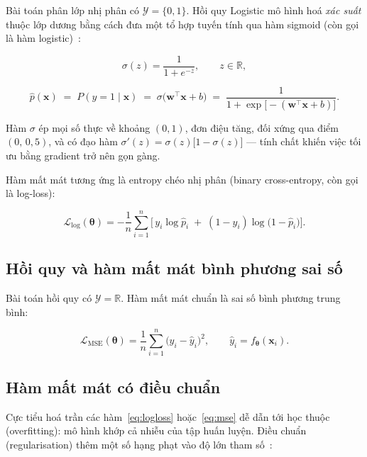 Bài toán phân lớp nhị phân có $\mathcal{Y}=\{0,1\}$. Hồi quy Logistic mô hình
hoá \emph{xác suất} thuộc lớp dương bằng cách đưa một tổ hợp tuyến tính qua
hàm sigmoid (còn gọi là hàm logistic)~\cite{bishop2006}:

\begin{equation}
\sigma(z) = \frac{1}{1+e^{-z}}, \qquad z \in \mathbb{R},
\label{eq:sigmoid}
\end{equation}

\begin{equation}
\hat p(\mathbf{x}) \;=\; P(y=1\mid \mathbf{x})
\;=\; \sigma\!\big(\mathbf{w}^{\!\top}\mathbf{x}+b\big)
\;=\; \frac{1}{1+\exp\!\big[-(\mathbf{w}^{\!\top}\mathbf{x}+b)\big]}.
\label{eq:logistic}
\end{equation}

\noindent Hàm $\sigma$ ép mọi số thực về khoảng $(0,1)$, đơn điệu tăng, đối
xứng qua điểm $(0,\,0{,}5)$, và có đạo hàm
$\sigma'(z)=\sigma(z)\big[1-\sigma(z)\big]$ --- tính chất khiến việc tối ưu
bằng gradient trở nên gọn gàng.

Hàm mất mát tương ứng là entropy chéo nhị phân (binary cross-entropy, còn gọi
là log-loss):

\begin{equation}
\mathcal{L}_{\mathrm{log}}(\bm\theta)
= -\frac{1}{n}\sum_{i=1}^{n}
\Big[\, y_i \log \hat p_i \;+\; (1-y_i)\log\big(1-\hat p_i\big) \Big].
\label{eq:logloss}
\end{equation}

\subsection{Hồi quy và hàm mất mát bình phương sai số}

Bài toán hồi quy có $\mathcal{Y}=\mathbb{R}$. Hàm mất mát chuẩn là sai số bình
phương trung bình:

\begin{equation}
\mathcal{L}_{\mathrm{MSE}}(\bm\theta)
= \frac{1}{n}\sum_{i=1}^{n}\big(y_i - \hat y_i\big)^{2},
\qquad \hat y_i = f_{\bm\theta}(\mathbf{x}_i).
\label{eq:mse}
\end{equation}

\subsection{Hàm mất mát có điều chuẩn}

Cực tiểu hoá trần các hàm~\eqref{eq:logloss} hoặc~\eqref{eq:mse} dễ dẫn tới học
thuộc (overfitting): mô hình khớp cả nhiễu của tập huấn luyện. Điều chuẩn
(regularisation) thêm một số hạng phạt vào độ lớn tham số~\cite{hastie2009}:

